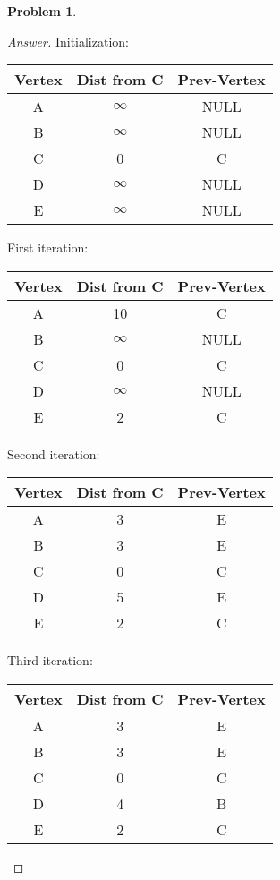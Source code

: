 \documentclass[11pt]{article}
\theoremstyle{definition}
\theoremstyle{definition}
\newtheorem{required}{Problem}
\theoremstyle{definition}
\begin{document}
\begin{required}
\begin{proof}[Answer]
Initialization:\\
\begin{center}
\begin{tabular}[c]{|c|c|c|} 
	Vertex &Dist from C &Prev-Vertex \\\hline
	A &$\infty$ & NULL\\
	B &$\infty$& NULL\\
	C &0& C\\
	D &$\infty$ & NULL\\
	E &$\infty$& NULL\\
\end{tabular}
\end{center}
First iteration:\\
\begin{center}
\begin{tabular}[c]{|c|c|c|} 
	Vertex &Dist from C &Prev-Vertex \\\hline
	A &10 & C\\
	B &$\infty$& NULL\\
	C &0& C\\
	D &$\infty$ & NULL\\
	E &2& C\\
\end{tabular}
\end{center}

Second iteration:\\
\begin{center}
\begin{tabular}[c]{|c|c|c|} 
	Vertex &Dist from C &Prev-Vertex \\\hline
	A &3 & E\\
	B &3& E\\
	C &0& C\\
	D &5 & E\\
	E &2& C\\
\end{tabular}
\end{center}

Third iteration:\\
\begin{center}
\begin{tabular}[c]{|c|c|c|} 
	Vertex &Dist from C &Prev-Vertex \\\hline
	A &3 & E\\
	B &3& E\\
	C &0& C\\
	D &4 & B\\
	E &2& C\\
\end{tabular}
\end{center}


\end{proof}
\end{required}
\end{document}
